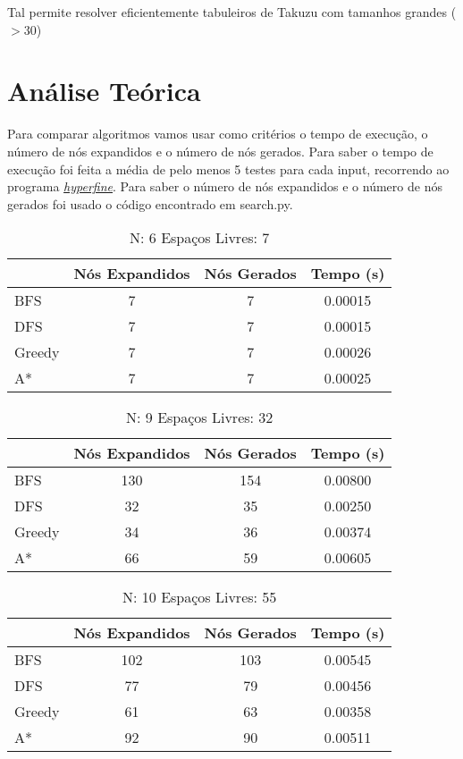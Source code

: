 \documentclass[12pt,a4paper]{article}
\begin{document}
  Tal permite resolver eficientemente tabuleiros de Takuzu com tamanhos grandes ($> 30$)
  

  \section{Análise Teórica}

  Para comparar algoritmos vamos usar como critérios o tempo de execução, o número de nós expandidos e o número de nós gerados.
  Para saber o tempo de execução foi feita a média de pelo menos 5 testes para cada input, recorrendo ao programa \href{https://github.com/sharkdp/hyperfine}{\textit{hyperfine}}.
  Para saber o número de nós expandidos e o número de nós gerados foi usado o código encontrado em search.py.

  \begin{table}[H]
    \caption{N: 6 Espaços Livres: 7}
    \label{tab:my-table}
    \centering
    \begin{tabular}{lccc}
      & Nós Expandidos & Nós Gerados & Tempo (s) \\
      \hline
      BFS    &  7 &  7 & 0.00015 \\
      DFS    &  7 &  7 & 0.00015 \\
      Greedy &  7 &  7 & 0.00026 \\
      A*     &  7 &  7 & 0.00025 \\
    \hline
    \end{tabular}
  \end{table}

  \begin{table}[H]
    \caption{N: 9 Espaços Livres: 32}
    \label{tab:my-table1}
    \centering
    \begin{tabular}{lccc}
      & Nós Expandidos & Nós Gerados & Tempo (s) \\
      \hline
      BFS     & 130 & 154 & 0.00800 \\
      DFS     &  32 &  35 & 0.00250 \\
      Greedy  &  34 &  36 & 0.00374 \\
      A*      &  66 &  59 & 0.00605 \\
    \hline
    \end{tabular}
  \end{table}

  \begin{table}[H]
    \caption{N: 10 Espaços Livres: 55}
    \label{tab:my-table2}
    \centering
    \begin{tabular}{lccc}
      & Nós Expandidos & Nós Gerados & Tempo (s) \\
      \hline
      BFS    & 102 & 103  & 0.00545 \\
      DFS    &  77 &  79  & 0.00456 \\
      Greedy &  61 &  63  & 0.00358 \\
      A*     &  92 &  90  & 0.00511 \\
    \hline
    \end{tabular}
  \end{table}
\end{document}
